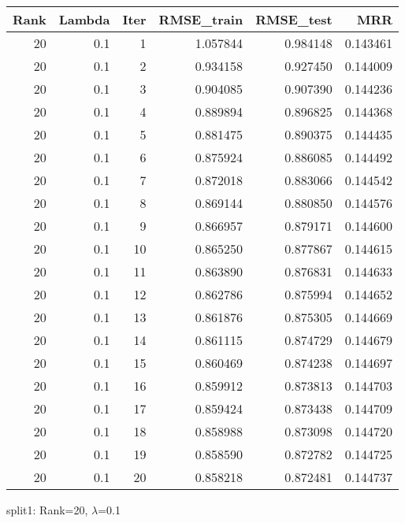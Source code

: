 \begin{tabular}{rrrrrr}
\toprule
 Rank &  Lambda &  Iter &  RMSE\_train &  RMSE\_test &       MRR \\
\midrule
   20 &     0.1 &     1 &    1.057844 &   0.984148 &  0.143461 \\
   20 &     0.1 &     2 &    0.934158 &   0.927450 &  0.144009 \\
   20 &     0.1 &     3 &    0.904085 &   0.907390 &  0.144236 \\
   20 &     0.1 &     4 &    0.889894 &   0.896825 &  0.144368 \\
   20 &     0.1 &     5 &    0.881475 &   0.890375 &  0.144435 \\
   20 &     0.1 &     6 &    0.875924 &   0.886085 &  0.144492 \\
   20 &     0.1 &     7 &    0.872018 &   0.883066 &  0.144542 \\
   20 &     0.1 &     8 &    0.869144 &   0.880850 &  0.144576 \\
   20 &     0.1 &     9 &    0.866957 &   0.879171 &  0.144600 \\
   20 &     0.1 &    10 &    0.865250 &   0.877867 &  0.144615 \\
   20 &     0.1 &    11 &    0.863890 &   0.876831 &  0.144633 \\
   20 &     0.1 &    12 &    0.862786 &   0.875994 &  0.144652 \\
   20 &     0.1 &    13 &    0.861876 &   0.875305 &  0.144669 \\
   20 &     0.1 &    14 &    0.861115 &   0.874729 &  0.144679 \\
   20 &     0.1 &    15 &    0.860469 &   0.874238 &  0.144697 \\
   20 &     0.1 &    16 &    0.859912 &   0.873813 &  0.144703 \\
   20 &     0.1 &    17 &    0.859424 &   0.873438 &  0.144709 \\
   20 &     0.1 &    18 &    0.858988 &   0.873098 &  0.144720 \\
   20 &     0.1 &    19 &    0.858590 &   0.872782 &  0.144725 \\
   20 &     0.1 &    20 &    0.858218 &   0.872481 &  0.144737 \\
\bottomrule
\end{tabular}

\caption{split1: Rank=20, $\lambda$=0.1}
